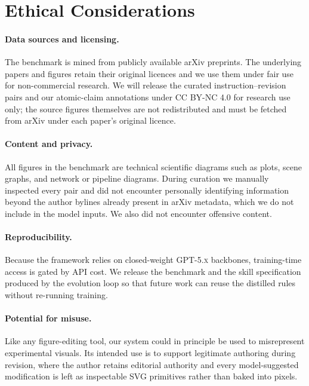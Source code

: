 \documentclass[11pt]{article}
\begin{document}
\section*{Ethical Considerations}

\paragraph{Data sources and licensing.}
The benchmark is mined from publicly available arXiv
preprints.  The underlying papers and figures retain their
original licences and we use them under fair use for
non-commercial research.  We will release the curated
instruction--revision pairs and our atomic-claim annotations
under \textsc{CC BY-NC 4.0} for research use only; the source
figures themselves are not redistributed and must be fetched
from arXiv under each paper's original licence.

\paragraph{Content and privacy.}
All figures in the benchmark are technical scientific
diagrams such as plots, scene graphs, and network or pipeline
diagrams.  During curation we manually inspected every pair
and did not encounter personally identifying information
beyond the author bylines already present in arXiv metadata,
which we do not include in the model inputs.  We also did not
encounter offensive content.

\paragraph{Reproducibility.}
Because the framework relies on closed-weight
\textsc{GPT-5.x} backbones, training-time access is gated by
API cost.  We release the benchmark and the skill
specification produced by the evolution loop so that future
work can reuse the distilled rules without re-running
training.

\paragraph{Potential for misuse.}
Like any figure-editing tool, our system could in principle
be used to misrepresent experimental visuals.  Its intended
use is to support legitimate authoring during revision, where
the author retains editorial authority and every
model-suggested modification is left as inspectable SVG
primitives rather than baked into pixels.
\end{document}
